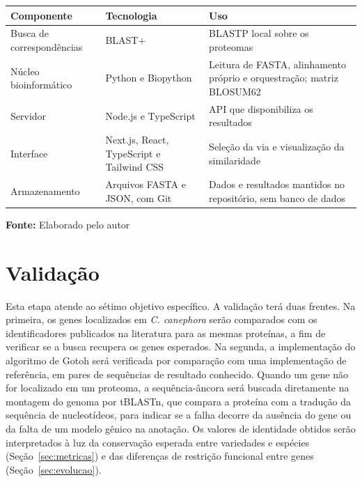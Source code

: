\FloatBarrier
\begin{quadro}[!htbp]
	\centering
	\SingleSpacing\footnotesize
	\caption{Tecnologias empregadas em cada componente da ferramenta}
	\begin{tabularx}{\textwidth}{|>{\raggedright\arraybackslash}p{3.4cm}|>{\raggedright\arraybackslash}p{4.4cm}|>{\raggedright\arraybackslash}X|}
		\hline
		\textbf{Componente} & \textbf{Tecnologia} & \textbf{Uso} \\ \hline
		Busca de correspondências & BLAST+ \cite{Camacho2009} & BLASTP local sobre os proteomas \\ \hline
		Núcleo bioinformático & Python e Biopython \cite{Cock2009} & Leitura de FASTA, alinhamento próprio e orquestração; matriz BLOSUM62 \\ \hline
		Servidor & Node.js e TypeScript & API que disponibiliza os resultados \\ \hline
		Interface & Next.js, React, TypeScript e Tailwind CSS & Seleção da via e visualização da similaridade \\ \hline
		Armazenamento & Arquivos FASTA e JSON, com Git & Dados e resultados mantidos no repositório, sem banco de dados \\ \hline
	\end{tabularx}
	\par\vspace{0.2cm}
	\textbf{Fonte:} Elaborado pelo autor
	\label{qua:ferramentas}
\end{quadro}
\FloatBarrier

\section{Validação}

Esta etapa atende ao sétimo objetivo específico. A validação terá duas frentes. Na primeira, os genes localizados em \textit{C. canephora} serão comparados com os identificadores publicados na literatura para as mesmas proteínas, a fim de verificar se a busca recupera os genes esperados. Na segunda, a implementação do algoritmo de Gotoh será verificada por comparação com uma implementação de referência, em pares de sequências de resultado conhecido. Quando um gene não for localizado em um proteoma, a sequência-âncora será buscada diretamente na montagem do genoma por tBLASTn, que compara a proteína com a tradução da sequência de nucleotídeos, para indicar se a falha decorre da ausência do gene ou da falta de um modelo gênico na anotação. Os valores de identidade obtidos serão interpretados à luz da conservação esperada entre variedades e espécies (Seção~\ref{sec:metricas}) e das diferenças de restrição funcional entre genes (Seção~\ref{sec:evolucao}).
